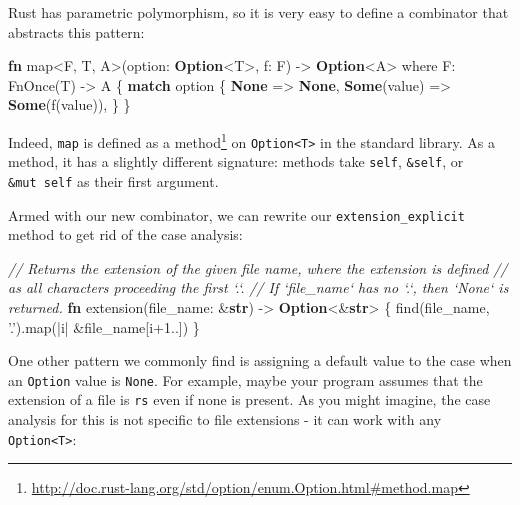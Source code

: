 \documentclass[a4paper,]{book}
\newenvironment{Shaded}{\begin{snugshade}}{\end{snugshade}}
\newcommand{\KeywordTok}[1]{\textcolor[rgb]{0.13,0.29,0.53}{\textbf{{#1}}}}
\newcommand{\DecValTok}[1]{\textcolor[rgb]{0.00,0.00,0.81}{{#1}}}
\newcommand{\CharTok}[1]{\textcolor[rgb]{0.31,0.60,0.02}{{#1}}}
\newcommand{\CommentTok}[1]{\textcolor[rgb]{0.56,0.35,0.01}{\textit{{#1}}}}
\newcommand{\NormalTok}[1]{{#1}}
\renewcommand{\href}[2]{#2\footnote{\url{#1}}}
\begin{document}
Rust has parametric polymorphism, so it is very easy to define a
combinator that abstracts this pattern:


\begin{Shaded}
\begin{Highlighting}[]
\KeywordTok{fn} \NormalTok{map<F, T, A>(option: }\KeywordTok{Option}\NormalTok{<T>, f: F) -> }\KeywordTok{Option}\NormalTok{<A> where F: FnOnce(T) -> A \{}
    \KeywordTok{match} \NormalTok{option \{}
        \KeywordTok{None} \NormalTok{=> }\KeywordTok{None}\NormalTok{,}
        \KeywordTok{Some}\NormalTok{(value) => }\KeywordTok{Some}\NormalTok{(f(value)),}
    \NormalTok{\}}
\NormalTok{\}}
\end{Highlighting}
\end{Shaded}

Indeed, \texttt{map} is
\href{http://doc.rust-lang.org/std/option/enum.Option.html\#method.map}{defined
as a method} on \texttt{Option\textless{}T\textgreater{}} in the
standard library. As a method, it has a slightly different signature:
methods take \texttt{self}, \texttt{\&self}, or \texttt{\&mut\ self} as
their first argument.

Armed with our new combinator, we can rewrite our
\texttt{extension\_explicit} method to get rid of the case analysis:

\begin{Shaded}
\begin{Highlighting}[]
\CommentTok{// Returns the extension of the given file name, where the extension is defined}
\CommentTok{// as all characters proceeding the first `.`.}
\CommentTok{// If `file_name` has no `.`, then `None` is returned.}
\KeywordTok{fn} \NormalTok{extension(file_name: &}\KeywordTok{str}\NormalTok{) -> }\KeywordTok{Option}\NormalTok{<&}\KeywordTok{str}\NormalTok{> \{}
    \NormalTok{find(file_name, }\CharTok{'.'}\NormalTok{).map(|i| &file_name[i+}\DecValTok{1.}\NormalTok{.])}
\NormalTok{\}}
\end{Highlighting}
\end{Shaded}

One other pattern we commonly find is assigning a default value to the
case when an \texttt{Option} value is \texttt{None}. For example, maybe
your program assumes that the extension of a file is \texttt{rs} even if
none is present. As you might imagine, the case analysis for this is not
specific to file extensions - it can work with any
\texttt{Option\textless{}T\textgreater{}}:
\end{document}
